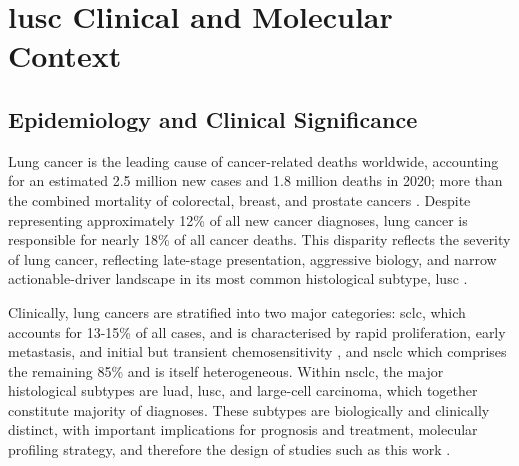 \section{\gls{lusc} Clinical and Molecular Context}

\subsection{Epidemiology and Clinical Significance}


Lung cancer is the leading cause of cancer-related deaths worldwide, accounting for an estimated 2.5 million new cases and 1.8 million deaths in 2020; more than the combined mortality of colorectal, breast, and prostate cancers \parencite{Bray2024}. Despite representing approximately 12\% of all new cancer diagnoses, lung cancer is responsible for nearly 18\% of all cancer deaths. This disparity reflects the severity of lung cancer, reflecting late-stage presentation, aggressive biology, and narrow actionable-driver landscape in its most common histological subtype, \gls{lusc} \parencite{Bray2024, Sung2021}. 


Clinically, lung cancers are stratified into two major categories: \gls{sclc}, which accounts for 13-15\% of all cases, and is characterised by rapid proliferation, early metastasis, and initial but transient chemosensitivity \parencite{Herbst2018}, and \gls{nsclc} which comprises the remaining 85\% and is itself heterogeneous. Within \gls{nsclc}, the major histological subtypes are \gls{luad}, \gls{lusc}, and large-cell carcinoma, which together constitute majority of diagnoses. These subtypes are biologically and clinically distinct, with important implications for prognosis and treatment, molecular profiling strategy, and therefore the design of studies such as this work \parencite{Herbst2018, Mino-Kenudson2022-xp}.

